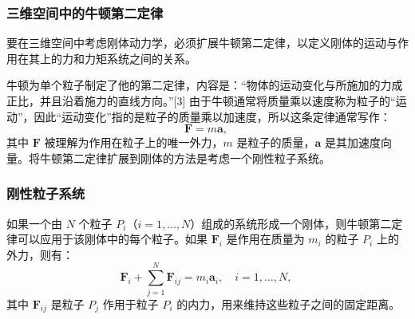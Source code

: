 \subsubsection{三维空间中的牛顿第二定律}  
要在三维空间中考虑刚体动力学，必须扩展牛顿第二定律，以定义刚体的运动与作用在其上的力和力矩系统之间的关系。

牛顿为单个粒子制定了他的第二定律，内容是：“物体的运动变化与所施加的力成正比，并且沿着施力的直线方向。”[3] 由于牛顿通常将质量乘以速度称为粒子的“运动”，因此“运动变化”指的是粒子的质量乘以加速度，所以这条定律通常写作：
\[
\mathbf{F} = m \mathbf{a},~
\]
其中 \( \mathbf{F} \) 被理解为作用在粒子上的唯一外力，\( m \) 是粒子的质量，\( \mathbf{a} \) 是其加速度向量。将牛顿第二定律扩展到刚体的方法是考虑一个刚性粒子系统。
\subsubsection{刚性粒子系统} 
如果一个由 \( N \) 个粒子 \( P_i \)（\( i=1, \dots, N \)）组成的系统形成一个刚体，则牛顿第二定律可以应用于该刚体中的每个粒子。如果 \( \mathbf{F}_i \) 是作用在质量为 \( m_i \) 的粒子 \( P_i \) 上的外力，则有：
\[
\mathbf{F}_i + \sum_{j=1}^{N} \mathbf{F}_{ij} = m_i \mathbf{a}_i, \quad i = 1, \dots, N,~
\]
其中 \( \mathbf{F}_{ij} \) 是粒子 \( P_j \) 作用于粒子 \( P_i \) 的内力，用来维持这些粒子之间的固定距离。